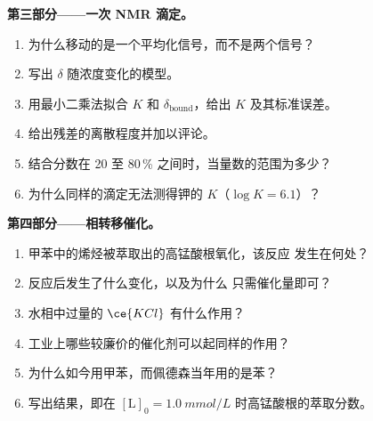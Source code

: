 \begin{problem}
\medskip\noindent\textbf{第三部分——一次 NMR 滴定。}
\begin{enumerate}[resume]
  \item 为什么移动的是一个平均化信号，而不是两个信号？
  \item 写出 $\delta$ 随浓度变化的模型。
  \item 用最小二乘法拟合 $K$ 和 $\delta_{\mathrm{bound}}$，给出 $K$ 及其标准误差。
  \item 给出残差的离散程度并加以评论。
  \item 结合分数在 20 至 80\,\% 之间时，当量数的范围为多少？
  \item 为什么同样的滴定无法测得钾的 $K$（$\log K = 6.1$）？
\end{enumerate}

\medskip\noindent\textbf{第四部分——相转移催化。}
\begin{enumerate}[resume]
  \item 甲苯中的烯烃被萃取出的高锰酸根氧化，该反应
        发生在何处？
  \item 反应后发生了什么变化，以及为什么
        只需催化量即可？
  \item 水相中过量的 $\ce{KCl}$ 有什么作用？
  \item 工业上哪些较廉价的催化剂可以起同样的作用？
  \item 为什么如今用甲苯，而佩德森当年用的是苯？
  \item 写出结果，即在
        $[\mathrm L]_0 = \qty{1.0}{mmol/L}$ 时高锰酸根的萃取分数。
\end{enumerate}
\end{problem}
